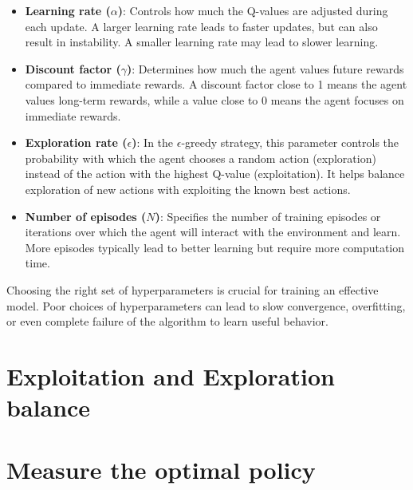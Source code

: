 \begin{itemize}
    \item \textbf{Learning rate ($\alpha$)}: Controls how much the Q-values are adjusted during each update. A larger learning rate leads to faster updates, but can also result in instability. A smaller learning rate may lead to slower learning.
    \item \textbf{Discount factor ($\gamma$)}: Determines how much the agent values future rewards compared to immediate rewards. A discount factor close to 1 means the agent values long-term rewards, while a value close to 0 means the agent focuses on immediate rewards.
    \item \textbf{Exploration rate ($\epsilon$)}: In the $\epsilon$-greedy strategy, this parameter controls the probability with which the agent chooses a random action (exploration) instead of the action with the highest Q-value (exploitation). It helps balance exploration of new actions with exploiting the known best actions.
    \item \textbf{Number of episodes ($N$)}: Specifies the number of training episodes or iterations over which the agent will interact with the environment and learn. More episodes typically lead to better learning but require more computation time.
\end{itemize}
Choosing the right set of hyperparameters is crucial for training an effective model. Poor choices of hyperparameters can lead to slow convergence, overfitting, or even complete failure of the algorithm to learn useful behavior.
\section{Exploitation and Exploration balance}
\section{Measure the optimal policy}